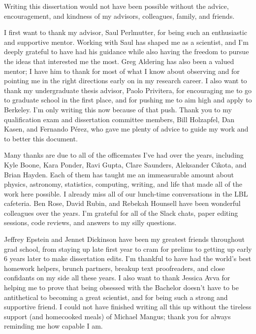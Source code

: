 \documentclass{ucbthesis}
\begin{document}
\begin{frontmatter}



\tableofcontents
\clearpage
\listoffigures
\clearpage
\listoftables
\begin{acknowledgements}
Writing this dissertation would not have been possible without the advice, encouragement, and kindness of my advisors, colleagues, family, and friends.

I first want to thank my advisor, Saul Perlmutter, for being such an enthusiastic and supportive mentor. Working with Saul has shaped me as a scientist, and I'm deeply grateful to have had his guidance while also having the freedom to pursue the ideas that interested me the most. Greg Aldering has also been a valued mentor; I have him to thank for most of what I know about observing and for pointing me in the right directions early on in my research career. I also want to thank my undergraduate thesis advisor, Paolo Privitera, for encouraging me to go to graduate school in the first place, and for pushing me to aim high and apply to Berkeley. I'm only writing this now because of that push. Thank you to my qualification exam and dissertation committee members, Bill Holzapfel, Dan Kasen, and Fernando P\'{e}rez, who gave me plenty of advice to guide my work and to better this document. 

Many thanks are due to all of the officemates I've had over the years, including Kyle Boone, Kara Ponder, Ravi Gupta, Clare Saunders, Aleksander Cikota, and Brian Hayden. Each of them has taught me an immeasurable amount about physics, astronomy, statistics, computing, writing, and life that made all of the work here possible. I already miss all of our lunch-time conversations in the LBL cafeteria. Ben Rose, David Rubin, and Rebekah Hounsell have been wonderful colleagues over the years. I'm grateful for all of the Slack chats, paper editing sessions, code reviews, and answers to my silly questions.

Jeffrey Epstein and Jennet Dickinson have been my greatest friends throughout grad school, from staying up late first year to cram for prelims to getting up early 6 years later to make dissertation edits. I'm thankful to have had the world's best homework helpers, brunch partners, breakup text proofreaders, and close confidants on my side all these years. I also want to thank Jessica Avva for helping me to prove that being obsessed with the Bachelor doesn't have to be antithetical to becoming a great scientist, and for being such a strong and supportive friend. I could not have finished writing all this up without the tireless support (and homecooked meals) of Michael Mangus; thank you for always reminding me how capable I am. 


\end{acknowledgements}
\end{frontmatter}
\end{document}

